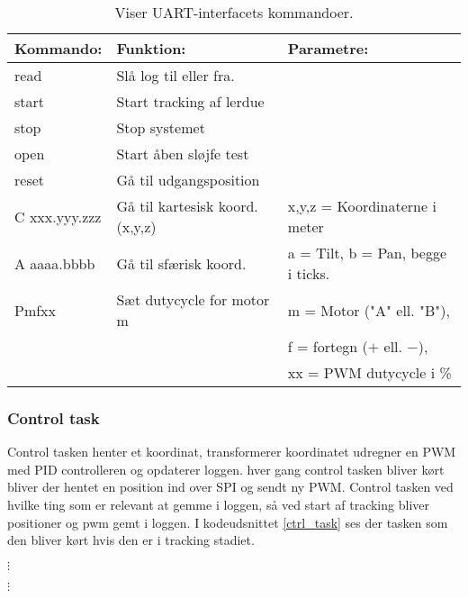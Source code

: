 \begin{table}[h!]
\begin{tabular}{|l|l|l|}
\hline 
Kommando: & Funktion: & Parametre: \\ 
\hline 
read & Slå log til eller fra.  &   \\ 
\hline 
start & Start tracking af lerdue &   \\ 
\hline 
stop & Stop systemet &   \\ 
\hline 
open & Start åben sløjfe test &   \\ 
\hline 
reset & Gå til udgangsposition &   \\ 
\hline 
C xxx.yyy.zzz & Gå til  kartesisk koord. (x,y,z) & x,y,z = Koordinaterne i meter \\ 
\hline 
A aaaa.bbbb & Gå til sfærisk koord.  & a = Tilt, b = Pan, begge i ticks. \\ 
\hline 
Pmfxx & Sæt dutycycle for motor m & m = Motor ("A" ell. "B"), \\ 
  & & f = fortegn ($+$ ell. $-$),  \\
  & & xx = PWM dutycycle i \%\\
\hline 
\end{tabular} 
\caption{Viser UART-interfacets kommandoer.}
\label{tb:uart_interface}
\end{table}



\subsubsection{Control task}
\label{sec:control_task}

Control tasken henter et koordinat, transformerer koordinatet udregner en PWM med PID controlleren og opdaterer loggen.
hver gang control tasken bliver kørt bliver der hentet en position ind over SPI og sendt ny PWM. 
Control tasken ved hvilke ting som er relevant at gemme i loggen, så ved start af tracking bliver positioner og pwm gemt i loggen.
I kodeudsnittet \ref{ctrl_task} ses der tasken som den bliver kørt hvis den er i tracking stadiet.


\(\vdots\)

\(\vdots\)

        
